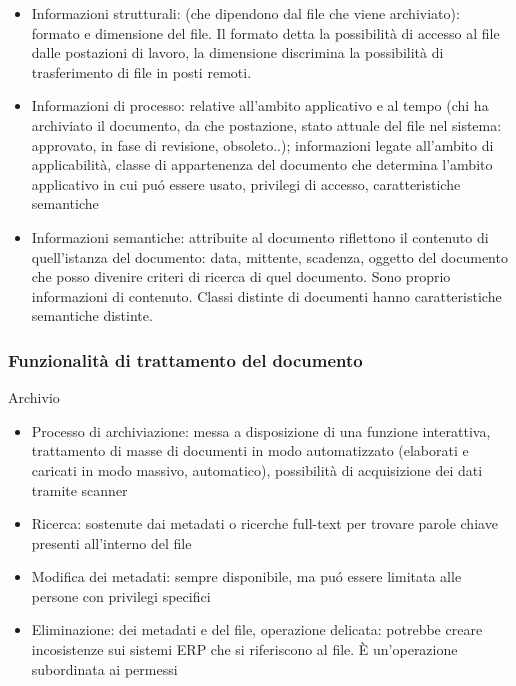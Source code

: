 \begin{itemize}

\item
  Informazioni strutturali: (che dipendono dal file che viene
  archiviato): formato e dimensione del file. Il formato detta la
  possibilit\`a di accesso al file dalle postazioni di lavoro, la
  dimensione discrimina la possibilit\`a di trasferimento di file in posti
  remoti.
\item
  Informazioni di processo: relative all'ambito applicativo e al tempo
  (chi ha archiviato il documento, da che postazione, stato attuale del
  file nel sistema: approvato, in fase di revisione, obsoleto..);
  informazioni legate all'ambito di applicabilit\`a, classe di
  appartenenza del documento che determina l'ambito applicativo in cui
  pu\'o essere usato, privilegi di accesso, caratteristiche semantiche
\item
  Informazioni semantiche: attribuite al documento riflettono il
  contenuto di quell'istanza del documento: data, mittente, scadenza,
  oggetto del documento che posso divenire criteri di ricerca di quel
  documento. Sono proprio informazioni di contenuto. Classi distinte di
  documenti hanno caratteristiche semantiche distinte.
\end{itemize}

\subsubsection{Funzionalit\`a di trattamento del
documento}

Archivio

\begin{itemize}

\item
  Processo di archiviazione: messa a disposizione di una funzione
  interattiva, trattamento di masse di documenti in modo automatizzato
  (elaborati e caricati in modo massivo, automatico), possibilit\`a di
  acquisizione dei dati tramite scanner
\item
  Ricerca: sostenute dai metadati o ricerche full-text per trovare
  parole chiave presenti all'interno del file
\item
  Modifica dei metadati: sempre disponibile, ma pu\'o essere limitata alle
  persone con privilegi specifici
\item
  Eliminazione: dei metadati e del file, operazione delicata: potrebbe
  creare incosistenze sui sistemi ERP che si riferiscono al file. È
  un'operazione subordinata ai permessi
\end{itemize}

